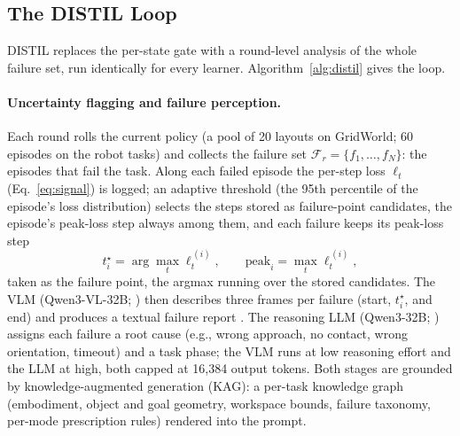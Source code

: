 \documentclass[letterpaper]{article} %
\begin{document}
\subsection{The DISTIL Loop}
\label{sec:distil}

DISTIL replaces the per-state gate with a round-level analysis of the whole
failure set, run identically for every learner.
Algorithm~\ref{alg:distil} gives the loop.

\paragraph{Uncertainty flagging and failure perception.}
Each round rolls the current policy (a pool of 20 layouts on GridWorld; 60
episodes on the robot tasks) and collects the failure set
$\mathcal{F}_r=\{f_1,\dots,f_N\}$: the episodes that fail the task. Along
each failed episode the per-step loss $\ell_t$ (Eq.~\ref{eq:signal}) is
logged; an adaptive threshold (the 95th percentile of the episode's loss
distribution) selects the steps stored as failure-point candidates, the
episode's peak-loss step always among them, and each failure keeps its
peak-loss step
\begin{equation}
t^\star_i=\arg\max_t \ell^{\,(i)}_t,
\qquad
\mathrm{peak}_i=\max_t \ell^{\,(i)}_t,
\label{eq:flag}
\end{equation}
taken as the failure point, the argmax running over the stored candidates.
The
VLM (Qwen3-VL-32B; \citealp{bai2025qwen3vl}) then describes three frames per
failure (start, $t^\star_i$, and end) and produces a textual failure report
\citep{liu2023reflect,duan2025aha}. The reasoning LLM (Qwen3-32B;
\citealp{yang2025qwen3}) assigns each failure a root cause (e.g., wrong
approach, no contact, wrong orientation, timeout) and a task phase; the VLM
runs at low reasoning effort and the LLM at high, both capped at 16{,}384
output tokens. Both
stages are grounded by knowledge-augmented generation (KAG): a per-task
knowledge graph (embodiment, object and goal geometry, workspace bounds,
failure taxonomy, per-mode prescription rules) rendered into the prompt.
\end{document}
